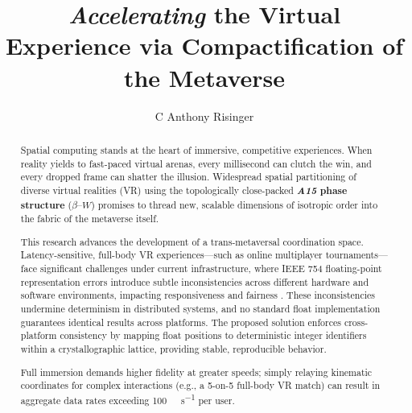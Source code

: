\documentclass[10pt]{article}
\def\AAAB{\textit{A15}}
\def\betaW{$\beta$--$W$}
\def\IL{Infima~Labs}
\begin{document}

\begin{opening}


    \author[%
        \IL{}, \URL{https://infima.space}, e-mail: \URL{anthony@infima.space}\\
        Snap Game Services, \URL{https://snap.gs}, e-mail: \URL{anthony@snap.gs}
    ]{C Anthony Risinger}


    \title{%
        \emph{Accelerating} {\normalsize the} Virtual Experience\newline{}
        {\normalsize via} Compactification {\normalsize of the} Metaverse
    }


    \begin{abstract}
        \setlength{\parindent}{0em}
        \setlength{\parskip}{1em}

        Spatial computing stands at the heart of immersive, competitive experiences. When reality yields to fast-paced virtual arenas, every millisecond can clutch the win, and every dropped frame can shatter the illusion. Widespread spatial partitioning of diverse virtual realities (VR) using the topologically close-packed \textbf{\AAAB{} phase structure} (\betaW{}) promises to thread new, scalable dimensions of isotropic order into the fabric of the metaverse itself.

        This research advances the development of a trans-metaversal coordination space. Latency-sensitive, full-body VR experiences---such as online multiplayer tournaments---face significant challenges under current infrastructure, where IEEE 754 floating-point representation errors introduce subtle inconsistencies across different hardware and software environments, impacting responsiveness and fairness \cite{Claypool2006}. These inconsistencies undermine determinism in distributed systems, and no standard float implementation guarantees identical results across platforms. The proposed solution enforces cross-platform consistency by mapping float positions to deterministic integer identifiers within a crystallographic lattice, providing stable, reproducible behavior.

        Full immersion demands higher fidelity at greater speeds; simply relaying kinematic coordinates for complex interactions (e.g., a 5-on-5 full-body VR match) can result in aggregate data rates exceeding \SI{100}{\kilo\bit\per\second} per user.


\end{abstract}
\end{opening}
\end{document}

